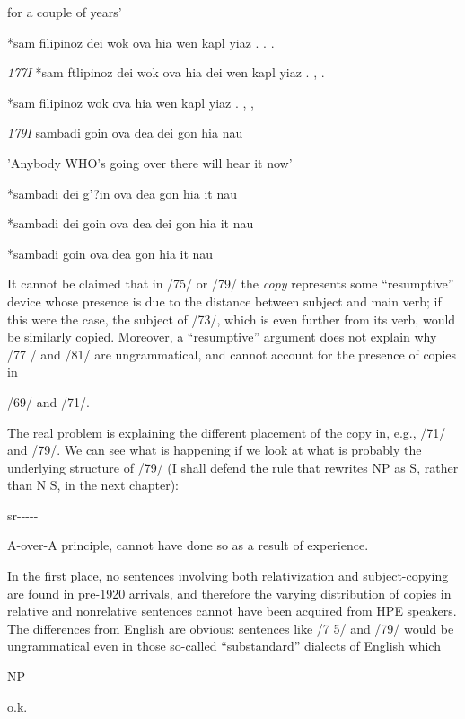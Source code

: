 for a couple of years'

\ea\label{ex:76}
 *sam filipinoz dei wok ova hia wen kapl yiaz . . .
\glt
\z

\textit{177I }*sam ftlipinoz dei wok ova hia dei wen kapl yiaz . , .

\ea\label{ex:78}
 *sam filipinoz wok ova hia wen kapl yiaz . , ,
\glt
\z

\textit{17}\textit{9}\textit{I }sambadi goin ova dea dei gon hia nau

'Anybody WHO's going over there will hear it now'

\ea\label{ex:80}
 *sambadi dei g'?in ova dea gon hia it nau
\glt
\z

\ea\label{ex:81}
 *sambadi dei goin ova dea dei gon hia it nau
\glt
\z

\ea\label{ex:82}
 *sambadi goin ova dea gon hia it nau
\glt
\z

It cannot be claimed that in /75/ or /79/ the \textit{c}\textit{o}\textit{py }represents some ``resumptive'' device whose presence is due to the distance be\-tween subject and main verb; if this were the case, the subject of /73/, which is even further from its verb, would be similarly copied. More\-over, a ``resumptive'' argument does not explain why /77 / and /81/ are ungrammatical, and cannot account for the presence of copies in

/69/ and /71/.


The real problem is explaining the different placement of the copy in, e.g., /71/ and /79/. We can see what is happening if we look at what is probably the underlying structure of /79/ (I shall defend the rule that rewrites NP as S, rather than N S, in the next chapter):

\ea\label{ex:83}
 sr-{}-{}-{}-{}-
\glt
\z


A-over-A principle, cannot have done so as a result of experience.

In the first place, no sentences involving both relativization and subject-copying are found in pre-1920 arrivals, and therefore the varying distribution of copies in relative and nonrelative sentences cannot have been acquired from HPE speakers. The differences from English are obvious: sentences like /7 5/ and /79/ would be ungramma\-tical even in those so-called ``substandard'' dialects of English which

NP

o.k.

